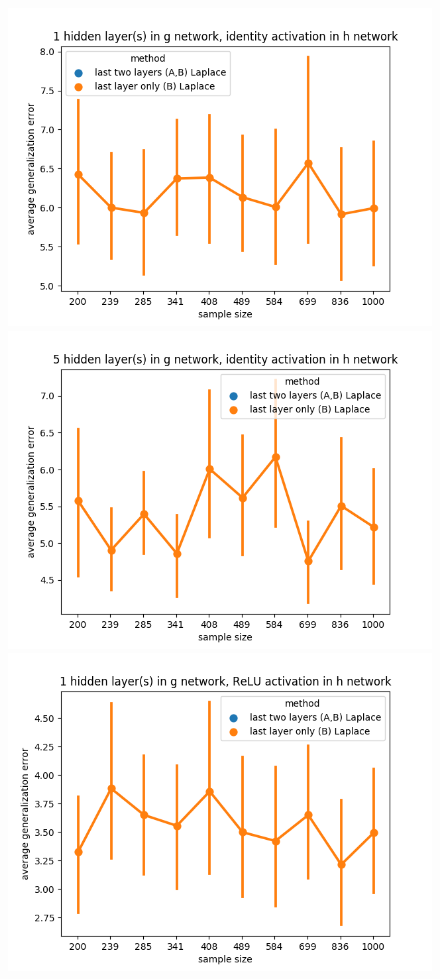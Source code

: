\documentclass{article} %
\begin{document}
\begin{figure}[t!]
	\begin{center}
		\includegraphics[scale=0.35]{laplace_taskid0.png}
		\includegraphics[scale=0.35]{laplace_taskid1.png}
		\includegraphics[scale=0.35]{laplace_taskid2.png}

\end{center}
\end{figure}
\end{document}
